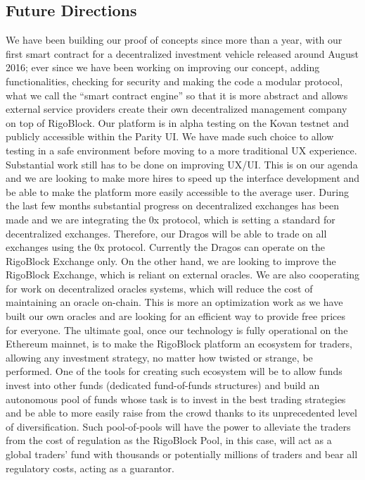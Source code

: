 \documentclass[9pt,oneside]{amsart}
\begin{document}
\begin{multicols}{2}
\section{Future Directions} \label{ch:future}
We have been building our proof of concepts since more than a year, with our first smart contract for a decentralized investment vehicle released around August 2016; ever since we have been working on improving our concept, adding functionalities, checking for security and making the code a modular protocol, what we call the “smart contract engine” so that it is more abstract and allows external service providers create their own decentralized management company on top of RigoBlock. Our platform is in alpha testing on the Kovan testnet and publicly accessible within the Parity UI. We have made such choice to allow testing in a safe environment before moving to a more traditional UX experience.
Substantial work still has to be done on improving UX/UI. This is on our agenda and we are looking to make more hires to speed up the interface development and be able to make the platform more easily accessible to the average user.
During the last few months substantial progress on decentralized exchanges has been made and we are integrating the 0x protocol, which is setting a standard for decentralized exchanges. Therefore, our Dragos will be able to trade on all exchanges using the 0x protocol. Currently the Dragos can operate on the RigoBlock Exchange only.
On the other hand, we are looking to improve the RigoBlock Exchange, which is reliant on external oracles. We are also cooperating for work on decentralized oracles systems, which will reduce the cost of maintaining an oracle on-chain. This is more an optimization work as we have built our own oracles and are looking for an efficient way to provide free prices for everyone.
The ultimate goal, once our technology is fully operational on the Ethereum mainnet, is to make the RigoBlock platform an ecosystem for traders, allowing any investment strategy, no matter how twisted or strange, be performed. One of the tools for creating such ecosystem will be to allow funds invest into other funds (dedicated fund-of-funds structures) and build an autonomous pool of funds whose task is to invest in the best trading strategies and be able to more easily raise from the crowd thanks to its unprecedented level of diversification. Such pool-of-pools will have the power to alleviate the traders from the cost of regulation as the RigoBlock Pool, in this case, will act as a global traders’ fund with thousands or potentially millions of traders and bear all regulatory costs, acting as a guarantor.

\end{multicols}
\end{document}
